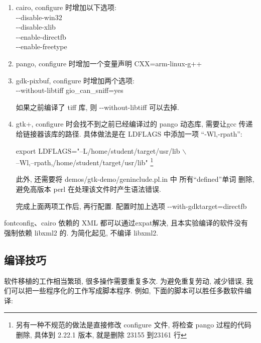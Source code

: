 \begin{enumerate}
  \item cairo,  configure 时增加以下选项:\\
      -{}-disable-win32 \\
      -{}-disable-xlib \\
      -{}-enable-directfb \\
      -{}-enable-freetype

  \item pango, configure 时增加一个变量声明 CXX=arm-linux-g++

  \item gdk-pixbuf, configure 时增加两个选项:\\
      -{}-without-libtiff gio\_can\_sniff=yes

      如果之前编译了 tiff 库, 则 -{}-without-libtiff 可以去掉.

  \item gtk+, configure 时会找不到之前已经编译过的 pango 动态库, 需要让gcc
      传递给链接器该库的路径. 具体做法是在 LDFLAGS 中添加一项 ``-Wl,-rpath'':

      export LDFLAGS="--L/home/student/target/usr/lib $\backslash$ \\ 
         --Wl,--rpath,/home/student/target/usr/lib"
      \footnote{另有一种不规范的做法是直接修改 configure 文件, 将检查 pango
      过程的代码删除, 具体到 2.22.1 版本, 就是删除 23155 到23161 行}

     此外, 还需要将 demos/gtk-demo/geninclude.pl.in 中 所有``defined''单词
     删除,避免高版本 perl 在处理该文件时产生语法错误.

     完成上面两项工作后, 再行配置. 配置时加上选项 -{}-with-gdktarget=directfb
\end{enumerate}

    fontconfig、cairo 依赖的 XML 都可以通过expat解决, 且本实验编译的软件没有
强制依赖 libxml2 的. 为简化起见, 不编译 libxml2.

\subsection{编译技巧}
    软件移植的工作相当繁琐, 很多操作需要重复多次. 为避免重复劳动, 减少错误,
我们可以把一些程序化的工作写成脚本程序. 例如, 下面的脚本可以胜任多数软件编译:

